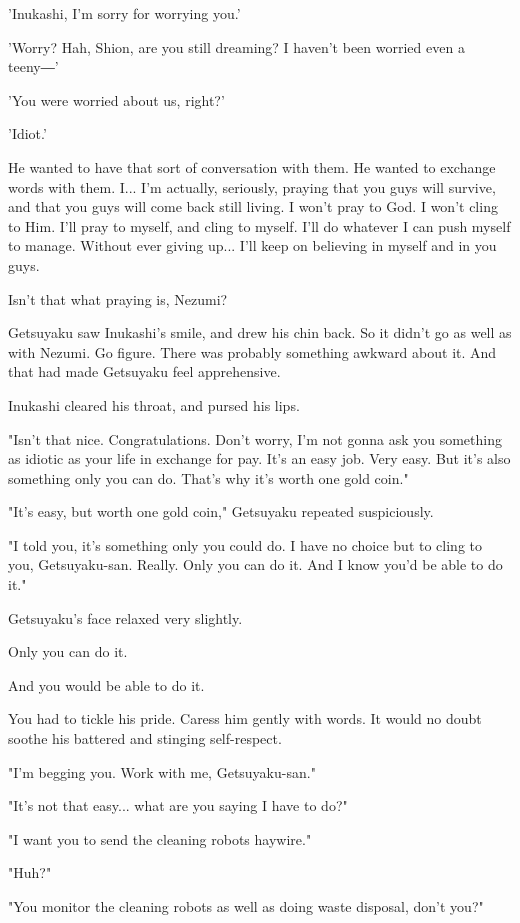 'Inukashi, I'm sorry for worrying you.'

'Worry? Hah, Shion, are you still dreaming? I haven't been worried even
a teeny―'

'You were worried about us, right?'

'Idiot.'

He wanted to have that sort of conversation with them. He wanted to
exchange words with them. I... I'm actually, seriously, praying that you
guys will survive, and that you guys will come back still living. I
won't pray to God. I won't cling to Him. I'll pray to myself, and cling
to myself. I'll do whatever I can push myself to manage. Without ever
giving up... I'll keep on believing in myself and in you guys.

Isn't that what praying is, Nezumi?

Getsuyaku saw Inukashi's smile, and drew his chin back. So it didn't go
as well as with Nezumi. Go figure. There was probably something awkward
about it. And that had made Getsuyaku feel apprehensive.

Inukashi cleared his throat, and pursed his lips.

"Isn't that nice. Congratulations. Don't worry, I'm not gonna ask you
something as idiotic as your life in exchange for pay. It's an easy job.
Very easy. But it's also something only you can do. That's why it's
worth one gold coin."

"It's easy, but worth one gold coin," Getsuyaku repeated suspiciously.

"I told you, it's something only you could do. I have no choice but to
cling to you, Getsuyaku-san. Really. Only you can do it. And I know
you'd be able to do it."

Getsuyaku's face relaxed very slightly.

Only you can do it.

And you would be able to do it.

You had to tickle his pride. Caress him gently with words. It would no
doubt soothe his battered and stinging self-respect.

"I'm begging you. Work with me, Getsuyaku-san."

"It's not that easy... what are you saying I have to do?"

"I want you to send the cleaning robots haywire."

"Huh?"

"You monitor the cleaning robots as well as doing waste disposal, don't
you?"

